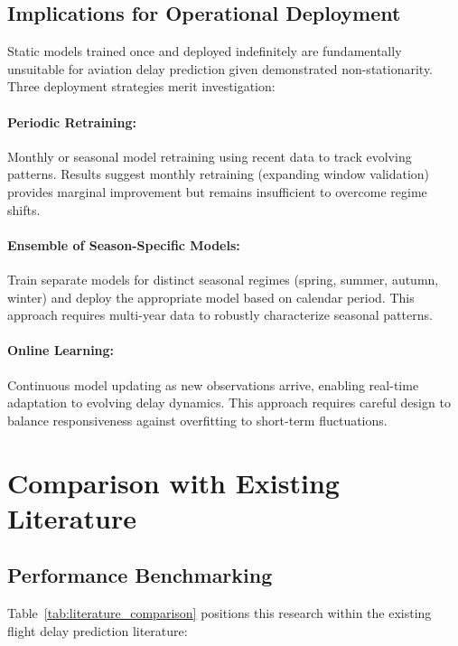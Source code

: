 \documentclass{report}
\begin{document}
\subsection{Implications for Operational Deployment}

Static models trained once and deployed indefinitely are fundamentally unsuitable for aviation delay prediction given demonstrated non-stationarity. Three deployment strategies merit investigation:

\paragraph{Periodic Retraining:} Monthly or seasonal model retraining using recent data to track evolving patterns. Results suggest monthly retraining (expanding window validation) provides marginal improvement but remains insufficient to overcome regime shifts.

\paragraph{Ensemble of Season-Specific Models:} Train separate models for distinct seasonal regimes (spring, summer, autumn, winter) and deploy the appropriate model based on calendar period. This approach requires multi-year data to robustly characterize seasonal patterns.

\paragraph{Online Learning:} Continuous model updating as new observations arrive, enabling real-time adaptation to evolving delay dynamics. This approach requires careful design to balance responsiveness against overfitting to short-term fluctuations.

\section{Comparison with Existing Literature}
\label{sec:literature_comparison}

\subsection{Performance Benchmarking}

Table~\ref{tab:literature_comparison} positions this research within the existing flight delay prediction literature:
\end{document}
